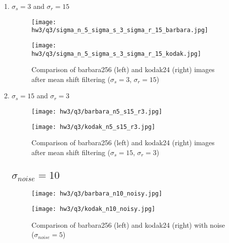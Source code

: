 \documentclass{article}
\begin{document}
\begin{enumerate}
    \item $\sigma_{s}=3$ and $\sigma_{r}=15$
    
    \begin{figure}[H]
        \centering
        \begin{minipage}{0.5\textwidth}
            \texttt{[image: hw3/q3/sigma\_n\_5\_sigma\_s\_3\_sigma\_r\_15\_barbara.jpg]}
        \end{minipage}
        \hfill
        \begin{minipage}{0.5\textwidth}
            \texttt{[image: hw3/q3/sigma\_n\_5\_sigma\_s\_3\_sigma\_r\_15\_kodak.jpg]}
        \end{minipage}
        \caption{Comparison of barbara256 (left) and kodak24 (right) images after mean shift filtering ($\sigma_{s}=3$, $\sigma_{r}=15$)}
    \end{figure}

    \item $\sigma_{s}=15$ and $\sigma_{r}=3$
    
    \begin{figure}[H]
        \centering
        \begin{minipage}{0.48\textwidth}
            \texttt{[image: hw3/q3/barbara\_n5\_s15\_r3.jpg]}
        \end{minipage}
        \hfill
        \begin{minipage}{0.48\textwidth}
            \texttt{[image: hw3/q3/kodak\_n5\_s15\_r3.jpg]}
        \end{minipage}
        \caption{Comparison of barbara256 (left) and kodak24 (right) images after mean shift filtering ($\sigma_{s}=15$, $\sigma_{r}=3$)}
    \end{figure}
\subsection{$\sigma_{noise}=10$}
    \begin{figure}[H]
        \centering
        \begin{minipage}{0.48\textwidth}
            \texttt{[image: hw3/q3/barbara\_n10\_noisy.jpg]}
        \end{minipage}
        \hfill
        \begin{minipage}{0.48\textwidth}
            \texttt{[image: hw3/q3/kodak\_n10\_noisy.jpg]}
        \end{minipage}
        \caption{Comparison of barbara256 (left) and kodak24 (right) with noise ($\sigma_{noise}=5$)}
    \end{figure}


\end{enumerate}
\end{document}
